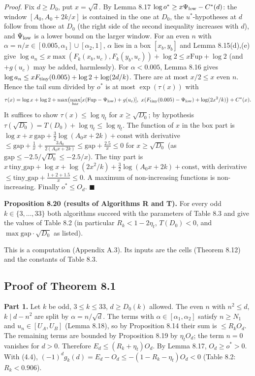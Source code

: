\emph{Proof.} Fix \(d\ge D_0\), put \(x=\sqrt d\). By Lemma 8.17 \(\log o^*\ge x\Psi_{\rm low}-C^*(d)\): the window \([A_0,A_0+2k/x]\) is contained in the one at \(D_0\), the \(u^*\)-hypotheses at \(d\) follow from those at \(D_0\) (the right side of the second inequality increases with \(d\)), and \(\Psi_{\rm low}\) is a lower bound on the larger window. For an even \(n\) with \(\alpha=n/x\in[0.005,\alpha_1]\cup[\alpha_2,1]\), \(\alpha\) lies in a box \([x_b,y_b]\) and Lemma 8.15(d),(e) give \(\log a_n\le x\max(F_k(x_b,u_c),F_k(y_b,u_c))+\log2\le x\mathrm{Fup}+\log 2\) (and \(+g(u_c)\) may be added, harmlessly). For \(\alpha<0.005\), Lemma 8.16 gives \(\log a_n\le xF_{\rm tiny}(0.005)+\log2+\log(2d/k)\). There are at most \(x/2\le x\) even \(n\). Hence the tail sum divided by \(o^*\) is at most \(\exp(\tau(x))\) with
\[\tau(x)=\log x+\log2+\max\bigl(\max_{box}[x(\mathrm{Fup}-\Psi_{\rm low})+g(u_c)],\ x(F_{\rm tiny}(0.005)-\Psi_{\rm low})+\log(2x^2/k)\bigr)+C^*(x).\]
It suffices to show \(\tau(x)\le\log\eta_t\) for \(x\ge\sqrt{D_0}\); by hypothesis \(\tau(\sqrt{D_0})=T(D_0)+\log\eta_t\le\log\eta_t\). The function of \(x\) in the box part is \(\log x+x\,\mathrm{gap}+\frac32\log(A_0x+2k)+\mathrm{const}\) with derivative \(\le\mathrm{gap}+\frac1x+\frac{3A_0}{2(A_0x+2k)}\le\mathrm{gap}+\frac{2.5}x\le0\) for \(x\ge\sqrt{D_0}\) (as \(\mathrm{gap}\le-2.5/\sqrt{D_0}\le-2.5/x\)). The tiny part is \(x\,\mathrm{tiny\_gap}+\log x+\log(2x^2/k)+\frac32\log(A_0x+2k)+\mathrm{const}\), with derivative \(\le\mathrm{tiny\_gap}+\frac{1+2+1.5}x\le0\). A maximum of non-increasing functions is non-increasing. Finally \(o^*\le O_d\). \(\blacksquare\)

\textbf{Proposition 8.20 (results of Algorithms R and T).} For every odd \(k\in\{3,\dots,33\}\) both algorithms succeed with the parameters of Table 8.3 and give the values of Table 8.2 (in particular \(R_k<1-2\eta_t\), \(T(D_0)<0\), and \(\max\text{gap}\cdot\sqrt{D_0}\) as listed).

This is a computation (Appendix A.3). Its inputs are the cells (Theorem 8.12) and the constants of Table 8.3.

\subsection{Proof of Theorem 8.1}\label{proof-of-theorem-8.1}

\textbf{Part 1.} Let \(k\) be odd, \(3\le k\le33\), \(d\ge D_0(k)\) allowed. The even \(n\) with \(n^2\le d\), \(k\mid d-n^2\) are split by \(\alpha=n/\sqrt d\). The terms with \(\alpha\in[\alpha_1,\alpha_2]\) satisfy \(n\ge N_1\) and \(u_n\in[U_A,U_B]\) (Lemma 8.18), so by Proposition 8.14 their sum is \(\le R_kO_d\). The remaining terms are bounded by Proposition 8.19 by \(\eta_tO_d\); the term \(n=0\) vanishes for \(d>0\). Therefore \(E_d\le(R_k+\eta_t)O_d\). By Lemma 8.17, \(O_d\ge o^*>0\). With (4.4), \((-1)^dg_k(d)=E_d-O_d\le-(1-R_k-\eta_t)O_d<0\) (Table 8.2: \(R_k<0.906\)).

